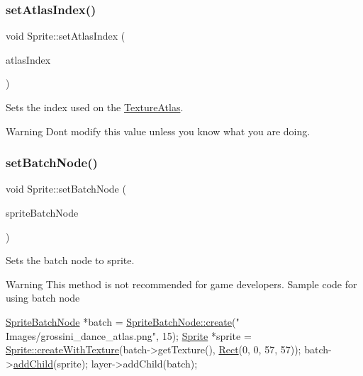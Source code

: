 \subsubsection{\texorpdfstring{set\+Atlas\+Index()}{setAtlasIndex()}\hspace{0.1cm}{\footnotesize\ttfamily [2/2]}}
{\footnotesize\ttfamily void Sprite\+::set\+Atlas\+Index (\begin{DoxyParamCaption}\item[{ssize\+\_\+t}]{atlas\+Index }\end{DoxyParamCaption})\hspace{0.3cm}{\ttfamily [inline]}}

Sets the index used on the \hyperlink{classTextureAtlas}{Texture\+Atlas}.

\begin{DoxyWarning}{Warning}
Don\textquotesingle{}t modify this value unless you know what you are doing. 
\end{DoxyWarning}
\mbox{\label{classSprite_a891c5d485efcc3a599236118d4434d87}} 
\subsubsection{\texorpdfstring{set\+Batch\+Node()}{setBatchNode()}\hspace{0.1cm}{\footnotesize\ttfamily [1/2]}}
{\footnotesize\ttfamily void Sprite\+::set\+Batch\+Node (\begin{DoxyParamCaption}\item[{\hyperlink{classSpriteBatchNode}{Sprite\+Batch\+Node} $\ast$}]{sprite\+Batch\+Node }\end{DoxyParamCaption})\hspace{0.3cm}{\ttfamily [virtual]}}

Sets the batch node to sprite. \begin{DoxyWarning}{Warning}
This method is not recommended for game developers. Sample code for using batch node 
\begin{DoxyCode}
\hyperlink{classSpriteBatchNode}{SpriteBatchNode} *batch = \hyperlink{classNode_aa9a92a1756b585d707a42c3fd1b274d4}{SpriteBatchNode::create}(\textcolor{stringliteral}{"
      Images/grossini\_dance\_atlas.png"}, 15);
\hyperlink{classSprite}{Sprite} *sprite = \hyperlink{classSprite_a8d9023960cc3b3d3b6c8109e0a778cdc}{Sprite::createWithTexture}(batch->getTexture(), 
      \hyperlink{classRect}{Rect}(0, 0, 57, 57));
batch->\hyperlink{classSpriteBatchNode_a4d84535b9cdc98d8cfbb8d978f84fc93}{addChild}(sprite);
layer->addChild(batch);
\end{DoxyCode}
 
\end{DoxyWarning}
\mbox{\label{classSprite_a8faffa895d0a302e86a8bcbf406df890}} 
